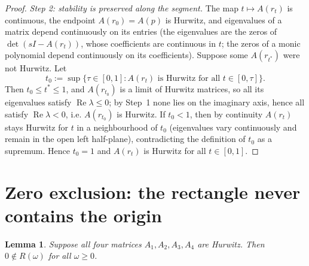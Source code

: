 \documentclass[12pt]{article}
\newtheorem{lemma}{Lemma}
\theoremstyle{definition}
\DeclareMathOperator{\Real}{Re}
\begin{document}
\begin{proof}
\emph{Step 2: stability is preserved along the segment.} The map $t\mapsto A(r_t)$ is
continuous, the endpoint $A(r_0)=A(p)$ is Hurwitz, and eigenvalues of a matrix depend
continuously on its entries (the eigenvalues are the zeros of $\det(sI-A(r_t))$, whose
coefficients are continuous in $t$; the zeros of a monic polynomial depend continuously on
its coefficients). Suppose some $A(r_{t^*})$ were not Hurwitz. Let
\[
t_0:=\sup\{\tau\in[0,1]:A(r_t)\text{ is Hurwitz for all }t\in[0,\tau]\}.
\]
Then $t_0\le t^*\le 1$, and $A(r_{t_0})$ is a limit of Hurwitz matrices, so all its
eigenvalues satisfy $\Real\lambda\le0$; by Step~1 none lies on the imaginary axis, hence
all satisfy $\Real\lambda<0$, i.e. $A(r_{t_0})$ is Hurwitz. If $t_0<1$, then by continuity
$A(r_t)$ stays Hurwitz for $t$ in a neighbourhood of $t_0$ (eigenvalues vary continuously
and remain in the open left half-plane), contradicting the definition of $t_0$ as a
supremum. Hence $t_0=1$ and $A(r_t)$ is Hurwitz for all $t\in[0,1]$.
\end{proof}

\section{Zero exclusion: the rectangle never contains the origin}

\begin{lemma}\label{lem:zero}
Suppose all four matrices $A_1,A_2,A_3,A_4$ are Hurwitz. Then $0\notin R(\omega)$ for all
$\omega\ge0$.
\end{lemma}
\end{document}
